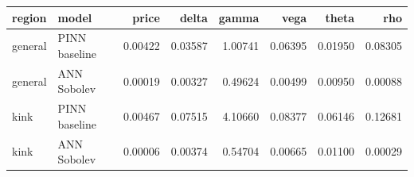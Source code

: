 \begin{tabular}{llrrrrrr}
\toprule
region & model & price & delta & gamma & vega & theta & rho \\
\midrule
general & PINN baseline & 0.00422 & 0.03587 & 1.00741 & 0.06395 & 0.01950 & 0.08305 \\
general & ANN Sobolev & 0.00019 & 0.00327 & 0.49624 & 0.00499 & 0.00950 & 0.00088 \\
kink & PINN baseline & 0.00467 & 0.07515 & 4.10660 & 0.08377 & 0.06146 & 0.12681 \\
kink & ANN Sobolev & 0.00006 & 0.00374 & 0.54704 & 0.00665 & 0.01100 & 0.00029 \\
\bottomrule
\end{tabular}
